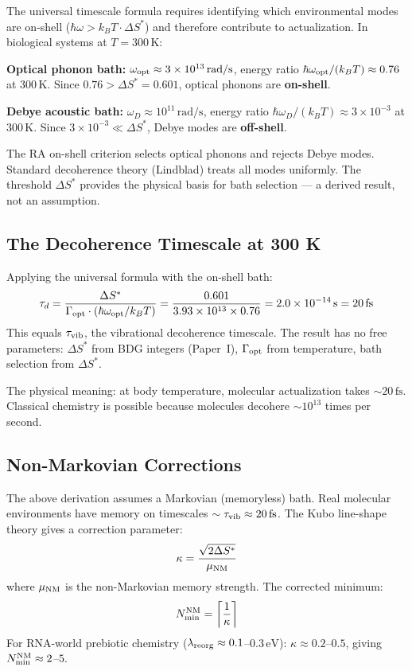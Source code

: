 \documentclass[12pt,a4paper]{article}
\begin{document}
The universal timescale formula requires identifying which environmental modes are on-shell ($\hbar\omega>k_BT\cdot\Delta S^*$) and therefore contribute to actualization.  In biological systems at $T=300\,\mathrm{K}$:

\textbf{Optical phonon bath:} $\omega_{\rm opt}\approx3\times10^{13}\,\mathrm{rad/s}$, energy ratio $\hbar\omega_{\rm opt}/(k_BT)\approx0.76$ at $300\,\mathrm{K}$.  Since $0.76>\Delta S^*=0.601$, optical phonons are \textbf{on-shell}.

\textbf{Debye acoustic bath:} $\omega_D\approx10^{11}\,\mathrm{rad/s}$, energy ratio $\hbar\omega_D/(k_BT)\approx3\times10^{-3}$ at $300\,\mathrm{K}$.  Since $3\times10^{-3}\ll\Delta S^*$, Debye modes are \textbf{off-shell}.

The RA on-shell criterion selects optical phonons and rejects Debye modes.  Standard decoherence theory (Lindblad) treats all modes uniformly.  The threshold $\Delta S^*$ provides the physical basis for bath selection --- a derived result, not an assumption.

\subsection{The Decoherence Timescale at 300 K}

Applying the universal formula with the on-shell bath:
\begin{equation}
  \tau_d = \frac{\Delta S^*}{\Gamma_{\rm opt}\cdot(\hbar\omega_{\rm opt}/k_BT)} = \frac{0.601}{3.93\times10^{13}\times0.76} = 2.0\times10^{-14}\,\mathrm{s} = 20\,\mathrm{fs}
  \label{eq:tau_bio}
\end{equation}
This equals $\tau_{\rm vib}$, the vibrational decoherence timescale.  The result has no free parameters: $\Delta S^*$ from BDG integers (Paper~I), $\Gamma_{\rm opt}$ from temperature, bath selection from $\Delta S^*$.

The physical meaning: at body temperature, molecular actualization takes $\sim20\,\mathrm{fs}$.  Classical chemistry is possible because molecules decohere $\sim10^{13}$ times per second.

\subsection{Non-Markovian Corrections}

The above derivation assumes a Markovian (memoryless) bath.  Real molecular environments have memory on timescales $\sim\tau_{\rm vib}\approx20\,\mathrm{fs}$.  The Kubo line-shape theory gives a correction parameter:
\begin{equation}
  \kappa = \frac{\sqrt{2\Delta S^*}}{\mu_{\rm NM}}
\end{equation}
where $\mu_{\rm NM}$ is the non-Markovian memory strength.  The corrected minimum:
\begin{equation}
  N_{\min}^{\rm NM} = \left\lceil\frac{1}{\kappa}\right\rceil
\end{equation}
For RNA-world prebiotic chemistry ($\lambda_{\rm reorg}\approx0.1$--$0.3\,\mathrm{eV}$): $\kappa\approx0.2$--$0.5$, giving $N_{\min}^{\rm NM}\approx2$--$5$.
\end{document}
